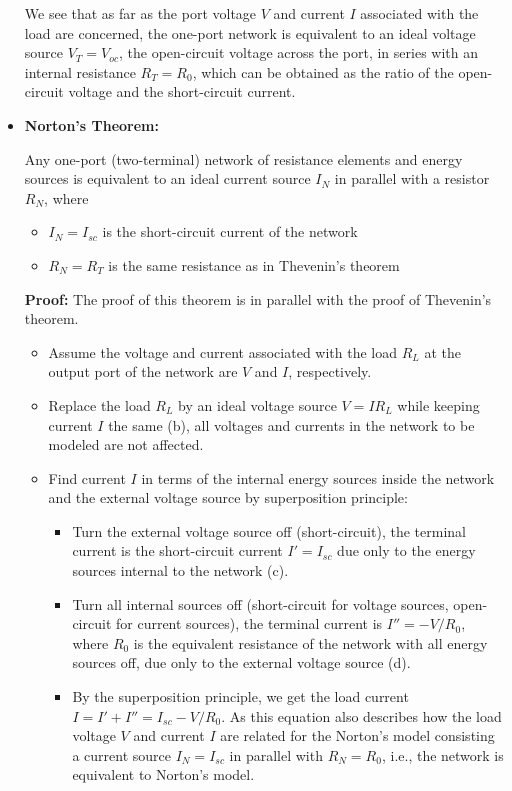 \begin{itemize}
\begin{itemize}
  \end{itemize}

  We see that as far as the port voltage $V$ and current $I$ associated 
  with the load are concerned, the one-port network is equivalent to an 
  ideal voltage source $V_T=V_{oc}$, the open-circuit voltage across the 
  port, in series with an internal resistance $R_T=R_0$, which can be 
  obtained as the ratio of the open-circuit voltage and the short-circuit 
  current.

\item {\bf Norton's Theorem:}

  Any one-port (two-terminal) network of resistance elements and energy 
  sources is equivalent to an ideal current source $I_N$ in parallel with a 
  resistor $R_N$, where
  \begin{itemize}
  \item $I_N=I_{sc}$ is the short-circuit current of the network
  \item $R_N=R_T$ is the same resistance as in Thevenin's theorem
  \end{itemize}

  {\bf Proof:} The proof of this theorem is in parallel with the proof of 
  Thevenin's theorem. 


  \begin{itemize}
  \item Assume the voltage and current associated with the load $R_L$ at
    the output port of the network are $V$ and $I$, respectively. 

  \item Replace the load $R_L$ by an ideal voltage source $V=IR_L$ while 
    keeping current $I$ the same (b), all voltages and currents in the 
    network to be modeled are not affected. 
	
  \item Find current $I$ in terms of the internal energy sources inside
    the network and the external voltage source by superposition principle:

    \begin{itemize}
    \item Turn the external voltage source off (short-circuit), the terminal
      current is the short-circuit current $I'=I_{sc}$ due only to the energy
      sources internal to the network (c).
    \item Turn all internal sources off (short-circuit for voltage sources, 
      open-circuit for current sources), the terminal current is $I''=-V/R_0$,
      where $R_0$ is the equivalent resistance of the network with all energy
      sources off, due only to the external voltage source (d).
    \item By the superposition principle, we get the load current  
      $I=I'+I''=I_{sc}-V/R_0$. As this equation also describes how the 
      load voltage $V$ and current $I$ are related for the Norton's model 
      consisting a current source $I_N=I_{sc}$ in parallel with $R_N=R_0$,
      i.e., the network is equivalent to Norton's model.
    \end{itemize}


\end{itemize}
\end{itemize}
